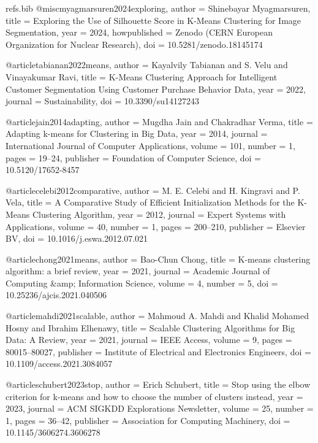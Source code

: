 \begin{filecontents*}[overwrite]{refs.bib}
@misc{myagmarsuren2024exploring,
  author = {Shinebayar Myagmarsuren},
  title = {{Exploring the Use of Silhouette Score in K-Means Clustering for Image Segmentation}},
  year = {2024},
  howpublished = {Zenodo (CERN European Organization for Nuclear Research)},
  doi = {10.5281/zenodo.18145174}
}

@article{tabianan2022means,
  author = {Kayalvily Tabianan and S. Velu and Vinayakumar Ravi},
  title = {{K-Means Clustering Approach for Intelligent Customer Segmentation Using Customer Purchase Behavior Data}},
  year = {2022},
  journal = {Sustainability},
  doi = {10.3390/su14127243}
}

@article{jain2014adapting,
  author = {Mugdha Jain and Chakradhar Verma},
  title = {{Adapting k-means for Clustering in Big Data}},
  year = {2014},
  journal = {International Journal of Computer Applications},
  volume = {101},
  number = {1},
  pages = {19--24},
  publisher = {Foundation of Computer Science},
  doi = {10.5120/17652-8457}
}

@article{celebi2012comparative,
  author = {M. E. Celebi and H. Kingravi and P. Vela},
  title = {{A Comparative Study of Efficient Initialization Methods for the K-Means Clustering Algorithm}},
  year = {2012},
  journal = {Expert Systems with Applications},
  volume = {40},
  number = {1},
  pages = {200--210},
  publisher = {Elsevier BV},
  doi = {10.1016/j.eswa.2012.07.021}
}

@article{chong2021means,
  author = {Bao-Chun Chong},
  title = {{K-means clustering algorithm: a brief review}},
  year = {2021},
  journal = {Academic Journal of Computing \&amp; Information Science},
  volume = {4},
  number = {5},
  doi = {10.25236/ajcis.2021.040506}
}

@article{mahdi2021scalable,
  author = {Mahmoud A. Mahdi and Khalid Mohamed Hosny and Ibrahim Elhenawy},
  title = {{Scalable Clustering Algorithms for Big Data: A Review}},
  year = {2021},
  journal = {IEEE Access},
  volume = {9},
  pages = {80015--80027},
  publisher = {Institute of Electrical and Electronics Engineers},
  doi = {10.1109/access.2021.3084057}
}

@article{schubert2023stop,
  author = {Erich Schubert},
  title = {{Stop using the elbow criterion for k-means and how to choose the number of clusters instead}},
  year = {2023},
  journal = {ACM SIGKDD Explorations Newsletter},
  volume = {25},
  number = {1},
  pages = {36--42},
  publisher = {Association for Computing Machinery},
  doi = {10.1145/3606274.3606278}
}


\end{filecontents*}
